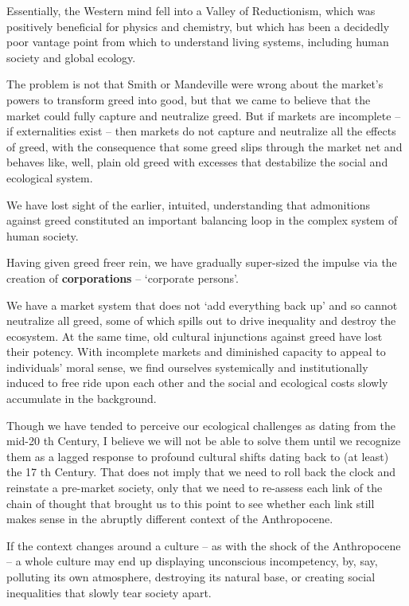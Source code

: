 \documentclass[
]{book}
\begin{document}
Essentially, the Western mind fell into a Valley of Reductionism, which was positively beneficial for
physics and chemistry, but which has been a decidedly poor vantage point from which to understand
living systems, including human society and global ecology.

The problem is not that Smith or Mandeville were wrong about the market's powers to transform
greed into good, but that we came to believe that the market could fully capture and neutralize greed.
But if markets are incomplete -- if externalities exist -- then markets do not capture and neutralize all
the effects of greed, with the consequence that some greed slips through the market net and behaves
like, well, plain old greed with excesses that destabilize the social and ecological system.

We have lost
sight of the earlier, intuited, understanding that admonitions against greed constituted an important
balancing loop in the complex system of human society.

Having given greed freer rein, we have gradually super-sized the impulse via the creation of
\textbf{corporations} -- `corporate persons'.

We have a market system that does not `add everything back up' and so cannot
neutralize all greed, some of which spills out to drive inequality and destroy the ecosystem. At the
same time, old cultural injunctions against greed have lost their potency. With incomplete markets
and diminished capacity to appeal to individuals' moral sense, we find ourselves systemically and
institutionally induced to free ride upon each other and the social and ecological costs slowly
accumulate in the background.

Though we have tended to perceive our ecological challenges as dating from the mid-20 th Century, I
believe we will not be able to solve them until we recognize them as a lagged response to profound
cultural shifts dating back to (at least) the 17 th Century. That does not imply that we need to roll back
the clock and reinstate a pre-market society, only that we need to re-assess each link of the chain of
thought that brought us to this point to see whether each link still makes sense in the abruptly
different context of the Anthropocene.

If the context changes around a culture -- as with the shock of the Anthropocene -- a
whole culture may end up displaying unconscious incompetency, by, say, polluting its own
atmosphere, destroying its natural base, or creating social inequalities that slowly tear society apart.
\end{document}
